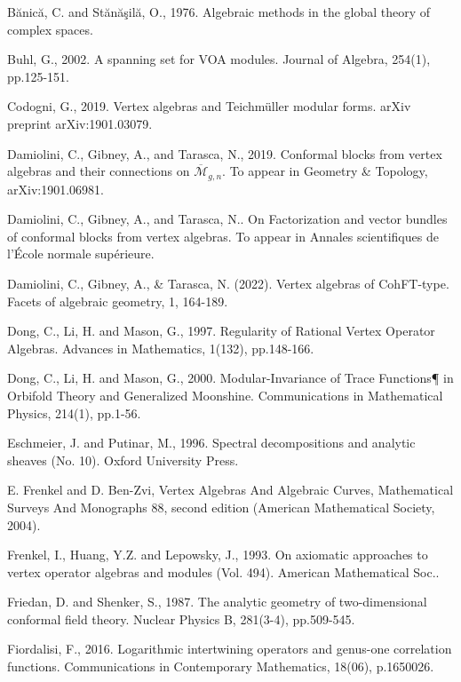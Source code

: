 \documentclass[11pt,b5paper,notitlepage]{article}
\theoremstyle{definition}
\theoremstyle{plain}
\newcommand{\mc}{\mathcal}
\newcommand{\ovl}{\overline}
\numberwithin{equation}{section}
\begin{document}
\begin{thebibliography}{999999}
		Bănică, C. and Stănăşilă, O., 1976. Algebraic methods in the global theory of complex spaces.
		
		Buhl, G., 2002. A spanning set for VOA modules. Journal of Algebra, 254(1), pp.125-151.
		
Codogni, G., 2019. Vertex algebras and Teichm\"uller modular forms. arXiv preprint arXiv:1901.03079.		
		
	Damiolini, C., Gibney, A., and Tarasca, N., 2019. Conformal blocks from vertex algebras and their connections on $\ovl{\mc M}_{g,n}$.  To appear in Geometry \& Topology, arXiv:1901.06981.
	
Damiolini, C., Gibney, A., and Tarasca, N.. On Factorization and vector bundles of conformal blocks from vertex algebras. To appear in Annales scientifiques de l’École normale supérieure.

Damiolini, C., Gibney, A., \& Tarasca, N. (2022). Vertex algebras of CohFT-type. Facets of algebraic geometry, 1, 164-189.
		
Dong, C., Li, H. and Mason, G., 1997. Regularity of Rational Vertex Operator Algebras. Advances in Mathematics, 1(132), pp.148-166.

Dong, C., Li, H. and Mason, G., 2000. Modular-Invariance of Trace Functions¶ in Orbifold Theory and Generalized Moonshine. Communications in Mathematical Physics, 214(1), pp.1-56.
		
		Eschmeier, J. and Putinar, M., 1996. Spectral decompositions and analytic sheaves (No. 10). Oxford University Press.
		
		E. Frenkel and D. Ben-Zvi, Vertex Algebras And Algebraic Curves, Mathematical Surveys And Monographs 88, second edition (American Mathematical Society, 2004).
		
		Frenkel, I., Huang, Y.Z. and Lepowsky, J., 1993. On axiomatic approaches to vertex operator algebras and modules (Vol. 494). American Mathematical Soc..
		
Friedan, D. and Shenker, S., 1987. The analytic geometry of two-dimensional conformal field theory. Nuclear Physics B, 281(3-4), pp.509-545.		
		
Fiordalisi, F., 2016. Logarithmic intertwining operators and genus-one correlation functions. Communications in Contemporary Mathematics, 18(06), p.1650026.		
		

\end{thebibliography}
\end{document}
